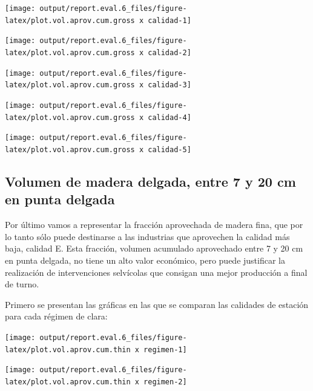 \documentclass[]{article}
\begin{document}
\begin{center}\texttt{[image: output/report.eval.6\_files/figure-latex/plot.vol.aprov.cum.gross x calidad-1]} \end{center}

\begin{center}\texttt{[image: output/report.eval.6\_files/figure-latex/plot.vol.aprov.cum.gross x calidad-2]} \end{center}

\begin{center}\texttt{[image: output/report.eval.6\_files/figure-latex/plot.vol.aprov.cum.gross x calidad-3]} \end{center}

\begin{center}\texttt{[image: output/report.eval.6\_files/figure-latex/plot.vol.aprov.cum.gross x calidad-4]} \end{center}

\begin{center}\texttt{[image: output/report.eval.6\_files/figure-latex/plot.vol.aprov.cum.gross x calidad-5]} \end{center}

\subsection{Volumen de madera delgada, entre 7 y 20 cm en punta
delgada}\label{volumen-de-madera-delgada-entre-7-y-20-cm-en-punta-delgada}

Por último vamos a representar la fracción aprovechada de madera fina,
que por lo tanto sólo puede destinarse a las industrias que aprovechen
la calidad más baja, calidad E. Esta fracción, volumen acumulado
aprovechado entre 7 y 20 cm en punta delgada, no tiene un alto valor
económico, pero puede justificar la realización de intervenciones
selvícolas que consigan una mejor producción a final de turno.

Primero se presentan las gráficas en las que se comparan las calidades
de estación para cada régimen de clara:

\begin{center}\texttt{[image: output/report.eval.6\_files/figure-latex/plot.vol.aprov.cum.thin x regimen-1]} \end{center}

\begin{center}\texttt{[image: output/report.eval.6\_files/figure-latex/plot.vol.aprov.cum.thin x regimen-2]} \end{center}
\end{document}

